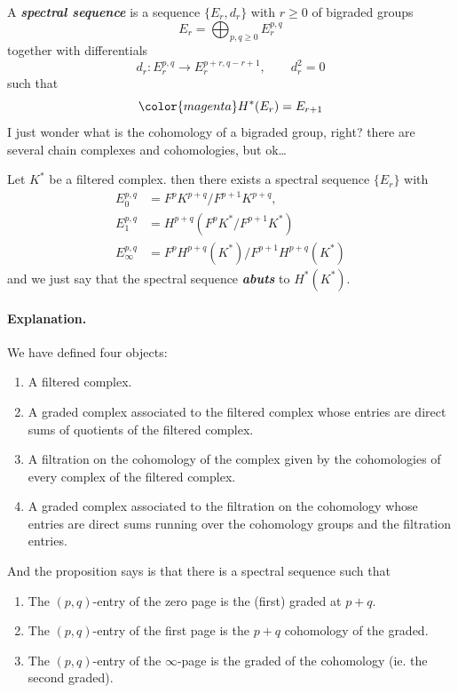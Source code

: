 \begin{defn}
	A \textit{\textbf{spectral sequence}} is a sequence $\{E_r,d_r\}$ with $r\geq 0$ of bigraded groups
	\[E_r=\bigoplus_{p,q\geq 0} E^{p,q}_r \]
together with differentials
\[d_r:E^{p,q}_r\to E^{p+r,q-r+1}_r,\qquad d^2_r=0\]
such that
\[{\color{magenta}H^{*}(E_r)=E_{r+1}}\]
{\color{magenta}I just wonder what is the cohomology of a bigraded group, right? there are several chain complexes and cohomologies, but ok…}
\end{defn}

\begin{prop}
	Let $K^*$ be a filtered complex. then there exists a spectral sequence $\{E_r\}$ with
	\begin{align*}
		E^{p,q}_0&=F^pK^{p+q}/F^{p+1}K^{p+q},\\
		E^{p,q}_1&=H^{p+q}\left( F^pK^*/F^{p+1}K^* \right)\\
		E^{p,q}_\infty&=F^pH^{p+q}(K^*)\big/F^{p+1}H^{p+q}(K^*)
	\end{align*}
and we just say that the spectral sequence \textit{\textbf{abuts}} to $H^{*}(K^*)$.
\end{prop}

\paragraph{Explanation.} We have defined four objects:
\begin{enumerate}
	\item A filtered complex.
	\item A graded complex associated to the filtered complex whose entries are direct sums of quotients of the filtered complex.
	\item A filtration on the cohomology of the complex given by the cohomologies of every complex of the filtered complex.
	\item A graded complex associated to the filtration on the cohomology whose entries are direct sums running over the cohomology groups and the filtration entries.
\end{enumerate}
And the proposition says is that there is a spectral sequence such that
\begin{enumerate}
	\item The $(p,q)$-entry of the zero page is the (first) graded at $p+q$.
	\item The $(p,q)$-entry of the first page is the $p+q$ cohomology of the graded.
	\item The $(p,q)$-entry of the $\infty$-page is the graded of the cohomology
 (ie. the second graded).
\end{enumerate}

